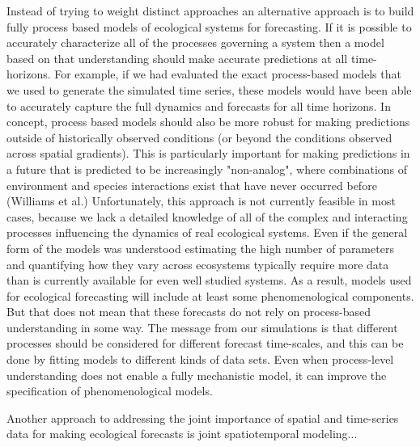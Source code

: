 \documentclass[11pt]{article}
\begin{document}
Instead of trying to weight distinct approaches an alternative approach is to build fully process based models of ecological systems  for forecasting.
If it is possible to accurately characterize all of the processes governing a system then a model based on that understanding should make accurate
predictions at all time-horizons. For example, if we had evaluated the exact process-based models that we used to generate the simulated time series,
these models would have been able to accurately capture the full dynamics and forecasts for all time horizons. In concept, process based models should
also be more robust for making predictions outside of historically observed conditions (or beyond the conditions observed across spatial gradients).
This is particularly important for making predictions in a future that is predicted to be increasingly "non-analog", where combinations of environment
and species interactions exist that have never occurred before (Williams et al.) Unfortunately, this approach is not currently feasible in most cases,
because we lack a detailed knowledge of all of the complex and interacting processes influencing the dynamics of real ecological systems. Even if the
general form of the models was understood estimating the high number of parameters and quantifying how they vary across
ecosystems typically require more data than is currently available for even well studied systems. As a result, models used for ecological forecasting
will include at least some phenomenological components. But that does not mean that these forecasts do not rely on process-based understanding in some way.
The message from our simulations is that different processes should be considered for different forecast time-scales, and this can be done by fitting
models to different kinds of data sets. Even when process-level understanding does not enable a fully mechanistic model, it can improve the specification
of phenomenological models.

Another approach to addressing the joint importance of spatial and time-series data for making ecological forecasts is joint spatiotemporal modeling...
\end{document}
